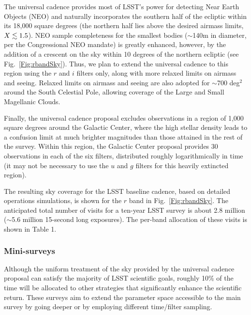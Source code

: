 \documentclass{emulateapj}
\begin{document}
The universal cadence provides most of LSST's power for detecting Near Earth 
Objects (NEO) and naturally incorporates the southern half of the ecliptic 
within its 18,000 square degrees (the northern half lies above the desired airmass 
limits, $X\lesssim1.5$). NEO sample completeness for the smallest bodies ($\sim$140m in 
diameter, per the Congressional NEO mandate) is greatly enhanced, however, by the 
addition of a crescent on the sky within 10 degrees of the northern ecliptic
(see Fig.~\ref{Fig:rbandSky}). Thus, we plan to extend
 the universal cadence to this region using the
$r$ and $i$ filters only, along 
with more relaxed limits on airmass and seeing. Relaxed limits on airmass and 
seeing are also adopted for $\sim$700 deg$^2$ around the South Celestial 
Pole, allowing coverage of the Large and Small Magellanic Clouds.

Finally, the universal cadence proposal excludes observations in a region of 
1,000 square degrees around the Galactic Center, where the high stellar
density leads to a confusion limit at much brighter magnitudes than those 
attained in the rest of the survey. Within this region, the Galactic Center
proposal provides 30 observations in each of the six filters, distributed 
roughly logarithmically in time (it may not be necessary to use the
$u$ and $g$ filters for this heavily extincted region). 

The resulting sky coverage for the LSST baseline
cadence, based on detailed operations simulations, is shown for the 
$r$ band in Fig.~\ref{Fig:rbandSky}. The anticipated total number of visits 
for a ten-year LSST survey is about 2.8 million ($\sim$5.6 million 15-second long
exposures). The per-band allocation of these visits is shown in Table 1.



\subsubsection{ Mini-surveys}
\label{Sec:minisurveys}

Although the uniform treatment of the sky provided by the universal cadence
proposal can satisfy the majority of LSST scientific goals, roughly 10\%
of the time will be allocated to other strategies that significantly enhance the 
scientific return.  These surveys aim to extend the parameter space accessible 
to the main survey by going deeper or by employing different time/filter
sampling. 
\end{document}
